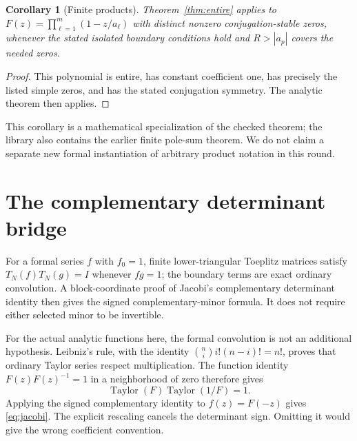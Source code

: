 \documentclass[11pt]{amsart}
\newtheorem{corollary}[theorem]{Corollary}
\begin{document}
\begin{corollary}[Finite products]
Theorem~\ref{thm:entire} applies to
$F(z)=\prod_{\ell=1}^m(1-z/a_\ell)$ with distinct nonzero conjugation-stable zeros, whenever the stated isolated boundary conditions hold and $R>|a_p|$ covers the needed zeros.
\end{corollary}
\begin{proof}
This polynomial is entire, has constant coefficient one, has precisely the listed simple zeros, and has the stated conjugation symmetry. The analytic theorem then applies.
\end{proof}
This corollary is a mathematical specialization of the checked theorem; the library also contains the earlier finite pole-sum theorem. We do not claim a separate new formal instantiation of arbitrary product notation in this round.

\section{The complementary determinant bridge}
For a formal series $f$ with $f_0=1$, finite lower-triangular Toeplitz matrices satisfy
$T_N(f)T_N(g)=I$ whenever $fg=1$; the boundary terms are exact ordinary convolution.
A block-coordinate proof of Jacobi's complementary determinant identity then gives the signed complementary-minor formula. It does not require either selected minor to be invertible.

For the actual analytic functions here, the formal convolution is not an additional hypothesis. Leibniz's rule, with the identity
$\binom ni i!(n-i)!=n!$, proves that ordinary Taylor series respect multiplication. The function identity $F(z)F(z)^{-1}=1$ in a neighborhood of zero therefore gives
\[
 \operatorname{Taylor}(F)\operatorname{Taylor}(1/F)=1.
\]
Applying the signed complementary identity to $f(z)=F(-z)$ gives \eqref{eq:jacobi}. The explicit rescaling cancels the determinant sign. Omitting it would give the wrong coefficient convention.
\end{document}
